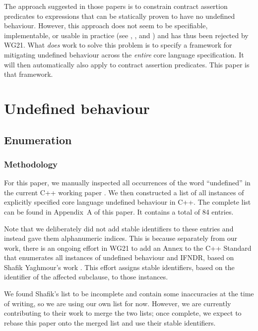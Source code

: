 The approach suggested in those papers is to constrain contract assertion predicates to expressions that can be statically proven to have no undefined behaviour. However, this approach does not seem to be specifiable, implementable, or usable in practice (see  \cite{P3376R0}, \cite{P3386R0}, and \cite{P3499R1}) and has thus been rejected by WG21. What \emph{does} work to solve this problem is to specify a framework for mitigating undefined behaviour across the \emph{entire} core language specification. It will then automatically also apply to contract assertion predicates. This paper is that framework.

\section{Undefined behaviour}
\label{ub}

\subsection{Enumeration}

\subsubsection{Methodology}

For this paper, we manually inspected all occurrences of the word ``undefined'' in the current C++ working paper \cite{N5008}. We then constructed a list of all instances of explicitly specified core language undefined behaviour in C++. The complete list can be found in Appendix~A of this paper. %
It contains a total of 84 entries. %

Note that we deliberately did not add stable identifiers to these entries and instead gave them alphanumeric indices. This is because separately from our work, there is an ongoing effort in WG21 to add an Annex to the C++ Standard that enumerates all instances of undefined behaviour and IFNDR, based on Shafik Yaghmour's work \cite{P3075R0}. This effort assigns stable identifiers, based on the identifier of the affected subclause, to those instances.

We found Shafik's list to be incomplete and contain some inaccuracies at the time of writing, so we are using our own list for now. However, we are currently contributing to their work to merge the two lists; once complete, we expect to rebase this paper onto the merged list and use their stable identifiers.

